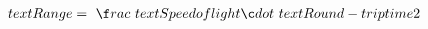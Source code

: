 \documentclass[preview]{standalone}
\begin{document}
\begin{align*}
\ t e x t { R a n g e }   =   \   \f r ac{\ t e x t {S p e e d   o f   l i gh t }   \c d o t   \ t e x t { R o u n d - t r i p   t i m e }}{2}
\end{align*}
\end{document}
